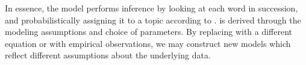In essence, the model performs inference by looking at each word in
succession, and probabilistically assigning it to a topic according to
.   is derived through the
modeling assumptions and choice of parameters.  By replacing
 with a different equation or with empirical
observations, we may construct new models which reflect different
assumptions about the underlying data.

